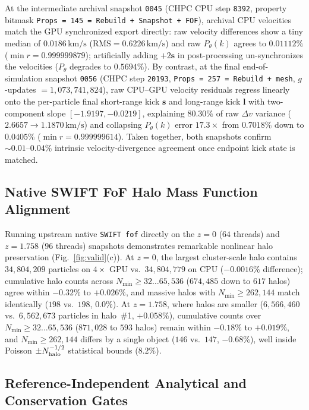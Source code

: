 \documentclass[aps,prd,reprint,superscriptaddress,nofootinbib,amsmath,amssymb,floatfix,longbibliography]{revtex4-2}
\begin{document}
At the intermediate archival snapshot \texttt{0045} (CHPC CPU step \texttt{8392}, property bitmask \texttt{Props = 145 = Rebuild + Snapshot + FOF}), archival CPU velocities match the GPU synchronized export directly: raw velocity differences show a tiny median of \textbf{$0.0186\,\mathrm{km/s}$} ($\mathrm{RMS} = 0.6226\,\mathrm{km/s}$) and raw $P_\theta(k)$ agrees to \textbf{$0.01112\%$} ($\min r = 0.999999879$); artificially adding $+2\mathbf{s}$ in post-processing un-synchronizes the velocities ($P_\theta$ degrades to $0.5694\%$). By contrast, at the final end-of-simulation snapshot \texttt{0056} (CHPC step \texttt{20193}, \texttt{Props = 257 = Rebuild + mesh}, $g$-updates $= 1{,}073{,}741{,}824$), raw CPU--GPU velocity residuals regress linearly onto the per-particle final short-range kick $\mathbf{s}$ and long-range kick $\mathbf{l}$ with two-component slope $[-1.9197, -0.0219]$, explaining \textbf{$80.30\%$} of raw $\Delta v$ variance ($2.6657 \rightarrow 1.1870\,\mathrm{km/s}$) and collapsing $P_\theta(k)$ error \textbf{$17.3\times$} from $0.7018\%$ down to \textbf{$0.0405\%$} ($\min r = 0.999999614$). Taken together, both snapshots confirm $\sim 0.01\text{--}0.04\%$ intrinsic velocity-divergence agreement once endpoint kick state is matched.

\subsection{Native SWIFT FoF Halo Mass Function Alignment}

Running upstream native \texttt{SWIFT fof} directly on the $z=0$ ($64$ threads) and $z=1.758$ ($96$ threads) snapshots demonstrates remarkable nonlinear halo preservation (Fig.~\ref{fig:valid}(c)). At $z=0$, the largest cluster-scale halo contains $34{,}804{,}209$ particles on $4\times$ GPU vs.\ $34{,}804{,}779$ on CPU ($-0.0016\%$ difference); cumulative halo counts across $N_{\min} \ge 32 \dots 65{,}536$ ($674{,}485$ down to $617$ halos) agree within $-0.32\%$ to $+0.026\%$, and massive halos with $N_{\min} \ge 262{,}144$ match identically ($198$ vs.\ $198$, $0.0\%$). At $z=1.758$, where halos are smaller ($6{,}566{,}460$ vs.\ $6{,}562{,}673$ particles in halo~\#1, $+0.058\%$), cumulative counts over $N_{\min} \ge 32 \dots 65{,}536$ ($871{,}028$ to $593$ halos) remain within $-0.18\%$ to $+0.019\%$, and $N_{\min} \ge 262{,}144$ differs by a single object ($146$ vs.\ $147$, $-0.68\%$), well inside Poisson $\pm N_{\rm halo}^{-1/2}$ statistical bounds ($8.2\%$).

\subsection{Reference-Independent Analytical and Conservation Gates}
\end{document}
